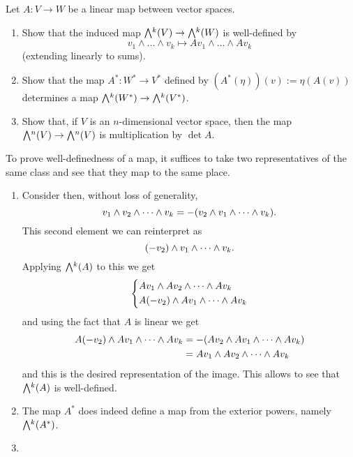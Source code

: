 \documentclass[12pt]{memoir}
\begin{document}

\begin{Ej}
    Let $A: V \to W$ be a linear map between vector spaces.
	\begin{enumerate}
		\item Show that the induced map $\exterior^k(V) \to \exterior^k(W)$ is well-defined by
		\[
			v_1 \wedge \ldots \wedge v_k \mapsto Av_1 \wedge \ldots \wedge Av_k
		\]
		(extending linearly to sums).
		
		\item Show that the map $A^*: W^* \to V^*$ defined by $(A^\ast(\eta))(v) := \eta(A(v))$ determines a map $\exterior^k(W^\ast) \to \exterior^k(V^\ast)$.
		
		\item Show that, if $V$ is an $n$-dimensional vector space, then the map $\exterior^n(V) \to \exterior^n(V)$ is multiplication by $\det A$.
	\end{enumerate}
\end{Ej}

\begin{ptcbr}
    To prove well-definedness of a map, it suffices to take two representatives of the same class and see that they map to the same place.
    \begin{enumerate}
        \item Consider then, without loss of generality,
        $$v_1\wedge v_2\wedge\cdots\wedge v_k=-(v_2\wedge v_1\wedge\cdots\wedge v_k).$$
        This second element we can reinterpret as 
        $$(-v_2)\wedge v_1\wedge\cdots\wedge v_k.$$
        Applying $\exterior^k(A)$ to this we get
        $$
        \left\lbrace
        \begin{aligned}
            &Av_1\wedge Av_2\wedge\cdots\wedge Av_k\\
            &A(-v_2)\wedge Av_1\wedge\cdots\wedge Av_k
        \end{aligned}
        \right.
        $$
        and using the fact that $A$ is linear we get 
        \begin{align*}
        A(-v_2)\wedge Av_1\wedge\cdots\wedge Av_k&=-(Av_2\wedge Av_1\wedge\cdots\wedge Av_k)\\
        &=Av_1\wedge Av_2\wedge\cdots\wedge Av_k
        \end{align*}
        and this is the desired representation of the image.  This allows to see that $\exterior^k(A)$ is well-defined.
        \item The map $A^\ast$ does indeed define a map from the exterior powers, namely $\exterior^k(A^\ast)$. 
        \item {}
    \end{enumerate}
\end{ptcbr}
\end{document}
